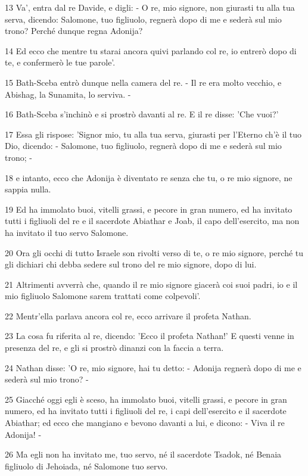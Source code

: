 \par 13 Va', entra dal re Davide, e digli: - O re, mio signore, non giurasti tu alla tua serva, dicendo: Salomone, tuo figliuolo, regnerà dopo di me e sederà sul mio trono? Perché dunque regna Adonija?
\par 14 Ed ecco che mentre tu starai ancora quivi parlando col re, io entrerò dopo di te, e confermerò le tue parole'.
\par 15 Bath-Sceba entrò dunque nella camera del re. - Il re era molto vecchio, e Abishag, la Sunamita, lo serviva. -
\par 16 Bath-Sceba s'inchinò e si prostrò davanti al re. E il re disse: 'Che vuoi?'
\par 17 Essa gli rispose: 'Signor mio, tu alla tua serva, giurasti per l'Eterno ch'è il tuo Dio, dicendo: - Salomone, tuo figliuolo, regnerà dopo di me e sederà sul mio trono; -
\par 18 e intanto, ecco che Adonija è diventato re senza che tu, o re mio signore, ne sappia nulla.
\par 19 Ed ha immolato buoi, vitelli grassi, e pecore in gran numero, ed ha invitato tutti i figliuoli del re e il sacerdote Abiathar e Joab, il capo dell'esercito, ma non ha invitato il tuo servo Salomone.
\par 20 Ora gli occhi di tutto Israele son rivolti verso di te, o re mio signore, perché tu gli dichiari chi debba sedere sul trono del re mio signore, dopo di lui.
\par 21 Altrimenti avverrà che, quando il re mio signore giacerà coi suoi padri, io e il mio figliuolo Salomone sarem trattati come colpevoli'.
\par 22 Mentr'ella parlava ancora col re, ecco arrivare il profeta Nathan.
\par 23 La cosa fu riferita al re, dicendo: 'Ecco il profeta Nathan!' E questi venne in presenza del re, e gli si prostrò dinanzi con la faccia a terra.
\par 24 Nathan disse: 'O re, mio signore, hai tu detto: - Adonija regnerà dopo di me e sederà sul mio trono? -
\par 25 Giacché oggi egli è sceso, ha immolato buoi, vitelli grassi, e pecore in gran numero, ed ha invitato tutti i figliuoli del re, i capi dell'esercito e il sacerdote Abiathar; ed ecco che mangiano e bevono davanti a lui, e dicono: - Viva il re Adonija! -
\par 26 Ma egli non ha invitato me, tuo servo, né il sacerdote Tsadok, né Benaia figliuolo di Jehoiada, né Salomone tuo servo.
